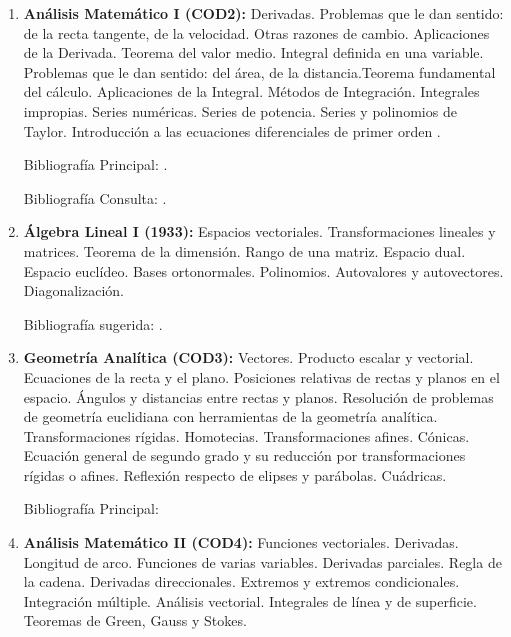 \documentclass[a4paper, 12pt]{article}
\begin{document}
\begin{enumerate}
\item \textbf{Análisis Matemático I (COD2):}   Derivadas.  Problemas que le dan sentido: de la recta tangente, de la velocidad. Otras razones de cambio. Aplicaciones de la Derivada. Teorema del valor medio. Integral definida en una variable.  Problemas que le dan sentido:  del área, de la distancia.Teorema fundamental del cálculo. Aplicaciones de la Integral. Métodos de Integración. Integrales impropias. Series numéricas. Series de potencia. Series y polinomios  de Taylor.  Introducción a las ecuaciones diferenciales de primer orden .

Bibliografía Principal: \cite{PeterD.Lax631,MichaelSpivak649,thomas2005calculo,GeorgeFinlaySimmons487}.

Bibliografía Consulta: \cite{ErnstHairer633,DavidApplebaum639,OttoToeplitz642,DavidBressoud643,DavidM.Bressoud651,DavidM.Bressoud688}.


\item \textbf{Álgebra Lineal I (1933):} Espacios vectoriales. Transformaciones
lineales y matrices. Teorema de la dimensión. Rango de una matriz.
Espacio dual. Espacio euclídeo. Bases ortonormales. Polinomios.
Autovalores y autovectores. Dia\-gonalización.

Bibliografía sugerida: \cite{hoffman, strang}.


\item \textbf{Geometría Analítica (COD3):} 
Vectores. Producto escalar y vectorial. Ecuaciones de la recta y el plano. Posiciones relativas de rectas y planos en el espacio. Ángulos y distancias entre rectas y planos. Resolución de problemas de geometría euclidiana con herramientas de la geometría analítica. Transformaciones rígidas. Homotecias. Transformaciones afines. Cónicas. Ecuación general de segundo grado y su reducción por transformaciones rígidas o afines. Reflexión respecto de elipses y parábolas. Cuádricas.



Bibliografía Principal: \cite{H.S.M.Coxeter226,DavidABrannan247,MicheleAudin38,RogerFenn248,VagnLundsgaardHansen85,C.G.Gibson97,GeorgeA.Jennings273,ArsenyV.Akopyan95,IlkaAgricola77}


\item \textbf{Análisis Matemático II (COD4):} Funciones vectoriales. Derivadas. Longitud de
arco. Funciones de varias variables. Derivadas parciales. Regla de
la cadena. Derivadas direccionales. Extremos y extremos
condicionales. Integración múltiple. Análisis vectorial.
Integrales de línea y de superficie. Teoremas de Green, Gauss y
Stokes.


\end{enumerate}
\end{document}
